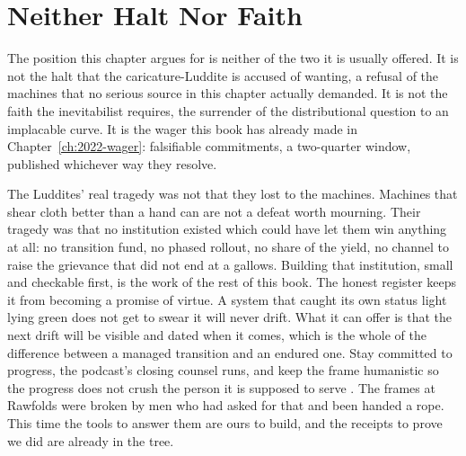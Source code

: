 \section{Neither Halt Nor Faith}

The position this chapter argues for is neither of the two it is usually offered. It is not the halt that the caricature-Luddite is accused of wanting, a refusal of the machines that no serious source in this chapter actually demanded. It is not the faith the inevitabilist requires, the surrender of the distributional question to an implacable curve. It is the wager this book has already made in Chapter~\ref{ch:2022-wager}: falsifiable commitments, a two-quarter window, published whichever way they resolve.

The Luddites' real tragedy was not that they lost to the machines. Machines that shear cloth better than a hand can are not a defeat worth mourning. Their tragedy was that no institution existed which could have let them win anything at all: no transition fund, no phased rollout, no share of the yield, no channel to raise the grievance that did not end at a gallows. Building that institution, small and checkable first, is the work of the rest of this book. The honest register keeps it from becoming a promise of virtue. A system that caught its own status light lying green does not get to swear it will never drift. What it can offer is that the next drift will be visible and dated when it comes, which is the whole of the difference between a managed transition and an endured one. Stay committed to progress, the podcast's closing counsel runs, and keep the frame humanistic so the progress does not crush the person it is supposed to serve \parencite{LynskeyDunt2026Luddites}. The frames at Rawfolds were broken by men who had asked for that and been handed a rope. This time the tools to answer them are ours to build, and the receipts to prove we did are already in the tree.
